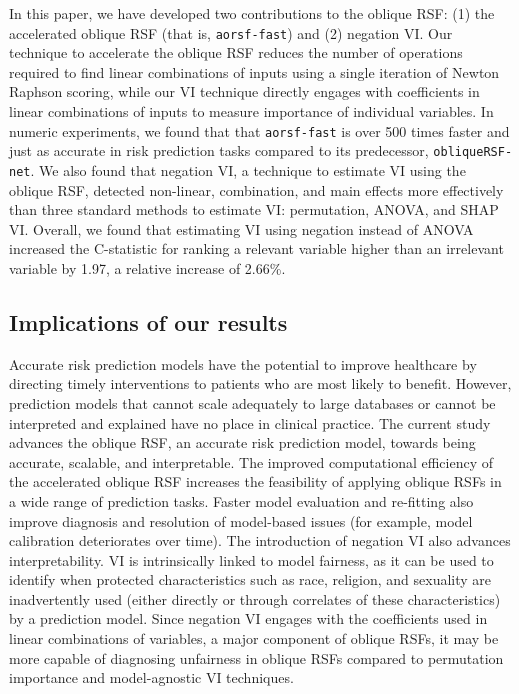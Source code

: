 \documentclass{article}\usepackage[]{graphicx}\usepackage[]{xcolor}
\newcommand{\ie}{that is}
\newcommand{\eg}{for example}
\begin{document}
In this paper, we have developed two contributions to the oblique RSF: (1) the accelerated oblique RSF (\ie, \texttt{aorsf-fast}) and (2) negation VI. Our technique to accelerate the oblique RSF reduces the number of operations required to find linear combinations of inputs using a single iteration of Newton Raphson scoring, while our VI technique directly engages with coefficients in linear combinations of inputs to measure importance of individual variables. In numeric experiments, we found that that \texttt{aorsf-fast} is over 500 times faster and just as accurate in risk prediction tasks compared to its predecessor, \texttt{obliqueRSF-net}. We also found that negation VI, a technique to estimate VI using the oblique RSF, detected non-linear, combination, and main effects more effectively than three standard methods to estimate VI: permutation, ANOVA, and SHAP VI. Overall, we found that estimating VI using negation instead of ANOVA increased the C-statistic for ranking a relevant variable higher than an irrelevant variable by 1.97, a relative increase of 2.66\%.

\subsection{Implications of our results}

Accurate risk prediction models have the potential to improve healthcare by directing timely interventions to patients who are most likely to benefit. However, prediction models that cannot scale adequately to large databases or cannot be interpreted and explained have no place in clinical practice. The current study advances the oblique RSF, an accurate risk prediction model, towards being accurate, scalable, and interpretable. The improved computational efficiency of the accelerated oblique RSF increases the feasibility of applying oblique RSFs in a wide range of prediction tasks. Faster model evaluation and re-fitting also improve diagnosis and resolution of model-based issues (\eg, model calibration deteriorates over time). The introduction of negation VI also advances interpretability. VI is intrinsically linked to model fairness, as it can be used to identify when protected characteristics such as race, religion, and sexuality are inadvertently used (either directly or through correlates of these characteristics) by a prediction model. Since negation VI  engages with the coefficients used in linear combinations of variables, a major component of oblique RSFs, it may be more capable of diagnosing unfairness in oblique RSFs compared to permutation importance and model-agnostic VI techniques.
\end{document}
